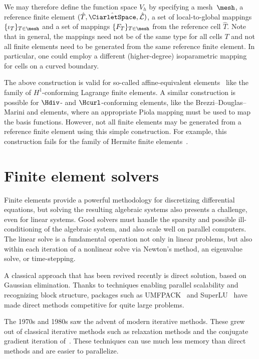We may therefore define the function space $V_h$ by specifying a
mesh~$\mesh$, a reference finite element $(\hat{T},
\hat{\CiarletSpace}, \hat{\mathcal{L}})$, a set of local-to-global
mappings $\{\iota_T\}_{T\in\mesh}$ and a set of mappings
$\{F_T\}_{T\in\mesh}$ from the reference cell $\hat{T}$. Note that in
general, the mappings need not be of the same type for all cells $T$
and not all finite elements need to be generated from the same
reference finite element. In particular, one could employ a different
(higher-degree) isoparametric mapping for cells on a curved boundary.

%
The above construction is valid for so-called affine-equivalent
elements~\citep{BrennerScott2008} like the family of $H^1$-conforming
Lagrange finite elements. A similar construction is possible for
$\Hdiv$- and $\Hcurl$-conforming elements, like the
Brezzi--Douglas--Marini and \nedelec{} elements, where an appropriate
Piola mapping must be used to map the basis functions. However, not
all finite elements may be generated from a reference finite element
using this simple construction. For example, this construction fails
for the family of Hermite finite
elements~\citep{Ciarlet2002,BrennerScott2008}.

\section{Finite element solvers}

Finite elements provide a powerful methodology for discretizing
differential equations, but solving the resulting algebraic systems
also presents a challenge, even for linear systems. Good solvers must
handle the sparsity and possible ill-conditioning of the algebraic
system, and also scale well on parallel computers.  The linear solve
is a fundamental operation not only in linear problems, but also
within each iteration of a nonlinear solve via Newton's method, an
eigenvalue solve, or time-stepping.

A classical approach that has been revived recently is direct
solution, based on Gaussian elimination.  Thanks to techniques
enabling parallel scalability and recognizing block structure,
packages such as UMFPACK~\citep{Davis2004} and SuperLU~\citep{Li2005}
have made direct methods competitive for quite large problems.

The 1970s and 1980s saw the advent of modern iterative methods. These
grew out of classical iterative methods such as relaxation methods and
the conjugate gradient iteration of~\citet{HestenesStiefel1952}. These
techniques can use much less memory than direct methods and are easier
to parallelize.

